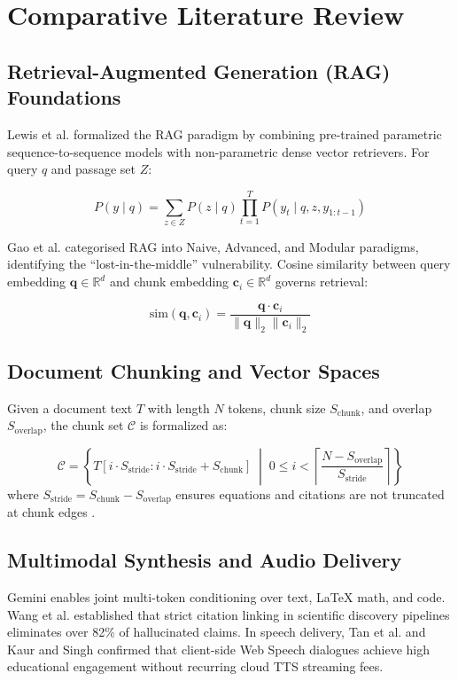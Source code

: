 \documentclass[conference]{IEEEtran}
\begin{document}
\section{Comparative Literature Review}

\subsection{Retrieval-Augmented Generation (RAG) Foundations}
Lewis et al. \cite{lewis2020} formalized the RAG paradigm by combining pre-trained parametric sequence-to-sequence models with non-parametric dense vector retrievers. For query $q$ and passage set $Z$:

\begin{equation}
P(y \mid q) = \sum_{z \in Z} P(z \mid q) \prod_{t=1}^{T} P(y_t \mid q, z, y_{1:t-1})
\end{equation}

Gao et al. \cite{gao2024} categorised RAG into Naive, Advanced, and Modular paradigms, identifying the ``lost-in-the-middle'' vulnerability. Cosine similarity between query embedding $\mathbf{q} \in \mathbb{R}^d$ and chunk embedding $\mathbf{c}_i \in \mathbb{R}^d$ governs retrieval:

\begin{equation}
\text{sim}(\mathbf{q}, \mathbf{c}_i) = \frac{\mathbf{q} \cdot \mathbf{c}_i}{\|\mathbf{q}\|_2 \|\mathbf{c}_i\|_2}
\end{equation}

\subsection{Document Chunking and Vector Spaces}
Given a document text $T$ with length $N$ tokens, chunk size $S_{\text{chunk}}$, and overlap $S_{\text{overlap}}$, the chunk set $\mathcal{C}$ is formalized as:

\begin{equation}
\mathcal{C} = \left\{ T[i \cdot S_{\text{stride}} : i \cdot S_{\text{stride}} + S_{\text{chunk}}] \;\middle|\; 0 \le i < \left\lceil \frac{N - S_{\text{overlap}}}{S_{\text{stride}}} \right\rceil \right\}
\end{equation}
where $S_{\text{stride}} = S_{\text{chunk}} - S_{\text{overlap}}$ ensures equations and citations are not truncated at chunk edges \cite{douze2024, chroma2024}.

\subsection{Multimodal Synthesis and Audio Delivery}
Gemini \cite{gemini2024} enables joint multi-token conditioning over text, LaTeX math, and code. Wang et al. \cite{wang2024} established that strict citation linking in scientific discovery pipelines eliminates over 82\% of hallucinated claims. In speech delivery, Tan et al. \cite{tan2023} and Kaur and Singh \cite{kaur2024} confirmed that client-side Web Speech dialogues achieve high educational engagement without recurring cloud TTS streaming fees.
\end{document}
